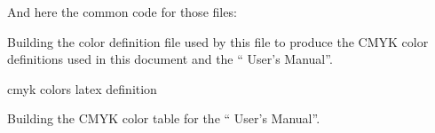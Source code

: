 \documentclass[11pt]{article}
\def\nwendcode{\endtrivlist \endgroup} %
\let\nwdocspar=\par                    %
\begin{document}
And here the common code for those files:

\nwenddocs{}\endmoddef
\nwendcode{}\nwdocspar


Building the color definition file used by this file to produce the CMYK color definitions used in this document and the ``{\prog} User's Manual''.
\label{sec:cmykfiles}

\nwenddocs{}\endmoddef
%
%
%
%
\LA{}cmyk colors latex definition~{\nwtagstyle{}}\RA{}
\nwendcode{}\nwdocspar

Building the CMYK color table for the ``{\prog} User's Manual''.
\end{document}
